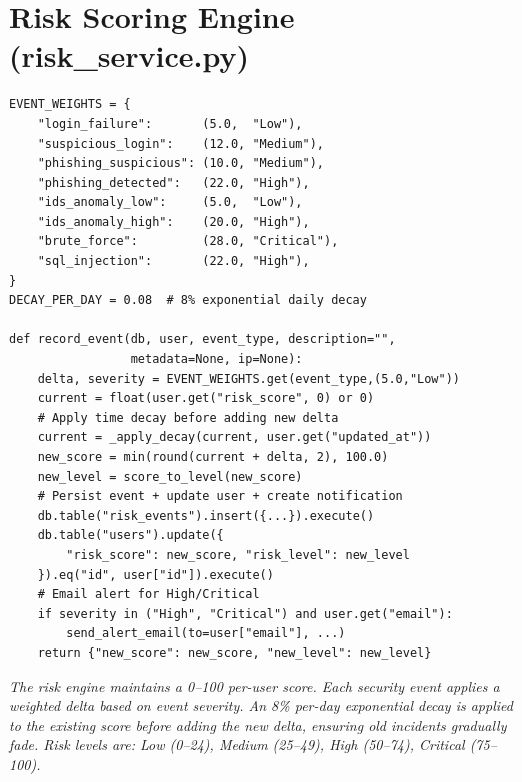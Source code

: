 \section{Risk Scoring Engine (risk\_service.py)}
\begin{verbatim}
EVENT_WEIGHTS = {
    "login_failure":       (5.0,  "Low"),
    "suspicious_login":    (12.0, "Medium"),
    "phishing_suspicious": (10.0, "Medium"),
    "phishing_detected":   (22.0, "High"),
    "ids_anomaly_low":     (5.0,  "Low"),
    "ids_anomaly_high":    (20.0, "High"),
    "brute_force":         (28.0, "Critical"),
    "sql_injection":       (22.0, "High"),
}
DECAY_PER_DAY = 0.08  # 8% exponential daily decay

def record_event(db, user, event_type, description="",
                 metadata=None, ip=None):
    delta, severity = EVENT_WEIGHTS.get(event_type,(5.0,"Low"))
    current = float(user.get("risk_score", 0) or 0)
    # Apply time decay before adding new delta
    current = _apply_decay(current, user.get("updated_at"))
    new_score = min(round(current + delta, 2), 100.0)
    new_level = score_to_level(new_score)
    # Persist event + update user + create notification
    db.table("risk_events").insert({...}).execute()
    db.table("users").update({
        "risk_score": new_score, "risk_level": new_level
    }).eq("id", user["id"]).execute()
    # Email alert for High/Critical
    if severity in ("High", "Critical") and user.get("email"):
        send_alert_email(to=user["email"], ...)
    return {"new_score": new_score, "new_level": new_level}
\end{verbatim}
\textit{The risk engine maintains a 0--100 per-user score. Each security event applies a weighted delta based on event severity. An 8\% per-day exponential decay is applied to the existing score before adding the new delta, ensuring old incidents gradually fade. Risk levels are: Low (0--24), Medium (25--49), High (50--74), Critical (75--100).}

